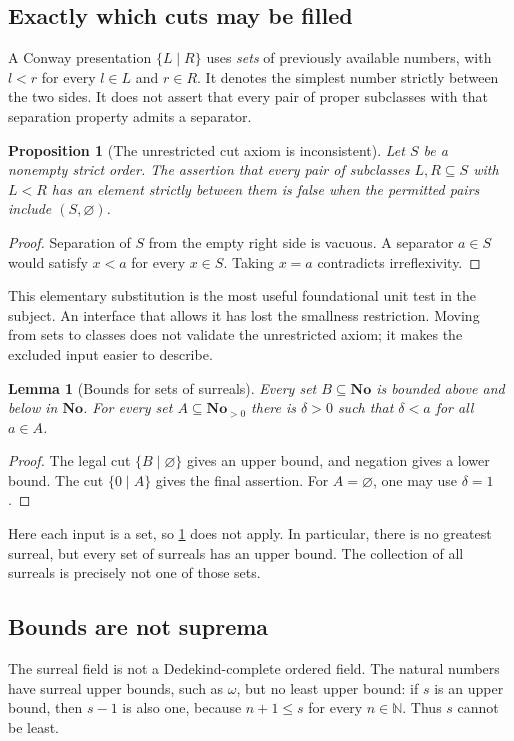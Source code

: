 \documentclass[11pt,letterpaper]{article}
\numberwithin{equation}{section}
\newtheorem{proposition}[theorem]{Proposition}
\newtheorem{lemma}[theorem]{Lemma}
\theoremstyle{definition}
\theoremstyle{remark}
\newcommand{\No}{\mathbf{No}}
\newcommand{\N}{\mathbb N}
\begin{document}
\subsection{Exactly which cuts may be filled}
A Conway presentation $\{L\mid R\}$ uses \emph{sets} of previously available numbers, with $l<r$ for every $l\in L$ and $r\in R$. It denotes the simplest number strictly between the two sides. It does not assert that every pair of proper subclasses with that separation property admits a separator.

\begin{proposition}[The unrestricted cut axiom is inconsistent]\label{prop:allcuts}
Let $S$ be a nonempty strict order. The assertion that every pair of subclasses $L,R\subseteq S$ with $L<R$ has an element strictly between them is false when the permitted pairs include $(S,\varnothing)$.
\end{proposition}
\begin{proof}
Separation of $S$ from the empty right side is vacuous. A separator $a\in S$ would satisfy $x<a$ for every $x\in S$. Taking $x=a$ contradicts irreflexivity.
\end{proof}
This elementary substitution is the most useful foundational unit test in the subject. An interface that allows it has lost the smallness restriction. Moving from sets to classes does not validate the unrestricted axiom; it makes the excluded input easier to describe.

\begin{lemma}[Bounds for sets of surreals]\label{lem:bounds}
Every set $B\subseteq\No$ is bounded above and below in $\No$. For every set $A\subseteq\No_{>0}$ there is $\delta>0$ such that $\delta<a$ for all $a\in A$.
\end{lemma}
\begin{proof}
The legal cut $\{B\mid\varnothing\}$ gives an upper bound, and negation gives a lower bound. The cut $\{0\mid A\}$ gives the final assertion. For $A=\varnothing$, one may use $\delta=1$.
\end{proof}
Here each input is a set, so \cref{prop:allcuts} does not apply. In particular, there is no greatest surreal, but every set of surreals has an upper bound. The collection of all surreals is precisely not one of those sets.

\subsection{Bounds are not suprema}
The surreal field is not a Dedekind-complete ordered field. The natural numbers have surreal upper bounds, such as $\omega$, but no least upper bound: if $s$ is an upper bound, then $s-1$ is also one, because $n+1\le s$ for every $n\in\N$. Thus $s$ cannot be least.
\end{document}
